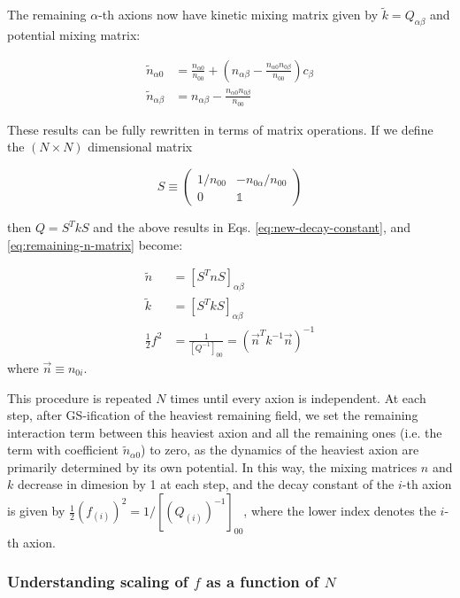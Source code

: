 \documentclass[11pt]{article}
\begin{document}
The remaining $\alpha$-th axions now have kinetic mixing matrix given by $\tilde{k}= Q_{\alpha\beta}$ and potential mixing matrix:

\begin{align}
    \label{eq:remaining-n-matrix}
    \tilde{n}_{\alpha 0} & = \frac{n_{\alpha 0}}{n_{00}} + (n_{\alpha\beta}-\frac{n_{\alpha 0}n_{0 \beta}}{n_{00}})c_\beta\\
    \tilde{n}_{\alpha\beta} & = n_{\alpha\beta} - \frac{n_{\alpha 0}n_{0 \beta}}{n_{00}}
\end{align}

These results can be fully rewritten in terms of matrix operations. If we define the $(N\times N)$ dimensional matrix

\begin{equation}
    S \equiv \begin{pmatrix}
        1/n_{00} & -n_{0\alpha}/n_{00} \\
        0 & \mathbb{1}
    \end{pmatrix}
\end{equation}

\noindent then $Q = S^TkS$ and the above results in Eqs. \eqref{eq:new-decay-constant}, and \eqref{eq:remaining-n-matrix} become:

\begin{align}
    \tilde{n} & = [S^TnS]_{\alpha\beta} \\
    \tilde{k} & = [S^TkS]_{\alpha\beta} \\
    \frac{1}{2}f^2 & = \frac{1}{[Q^{-1}]_{00}}  = (\vec n^T k^{-1} \vec n)^{-1}\label{eq:f-matrix-version}
\end{align}
where $\vec{n} \equiv n_{0i}$.

This procedure is repeated $N$ times until every axion is independent. At each step, after GS-ification of the heaviest remaining field, we set the remaining interaction term between this heaviest axion and all the remaining ones (i.e. the term with coefficient $\tilde{n}_{\alpha 0}$) to zero, as the dynamics of the heaviest axion are primarily determined by its own potential. In this way, the mixing matrices $n$ and $k$ decrease in dimesion by 1 at each step, and the decay constant of the $i$-th axion is given by $\frac{1}{2}(f_{(i)})^2 = 1/[(Q_{(i)})^{-1}]_{00}$, where the lower index denotes the $i$-th axion.

\subsubsection{Understanding scaling of $f$ as a function of $N$}
\end{document}
